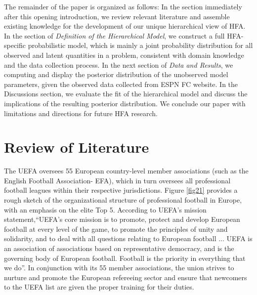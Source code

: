 \documentclass[USenglish]{article}
\begin{document}
The remainder of the paper is organized as follows: In the section immediately after this opening introduction, we review relevant literature and assemble existing knowledge for the development of our unique hierarchical view of HFA. 
In the section of \textit{Definition of the Hierarchical Model}, we construct a full HFA-specific probabilistic model, which is mainly a joint probability distribution for all observed and latent quantities in a problem, consistent with domain knowledge and the data collection process.
In the next section of \textit{Data and Results}, we computing and display the posterior distribution of the unobserved model parameters, given the observed data collected from ESPN FC website.
In the Discussions section, we evaluate the fit of the hierarchical model and discuss the implications of the resulting posterior distribution. We conclude our paper with limitations and directions for future HFA research.
 
\section{Review of Literature} 

The UEFA oversees 55 European country-level member associations (such as the English Football Association- EFA), which in turn oversees all professional football leagues within their respective jurisdictions. Figure \ref{fig21} provides a rough sketch of the organizational structure of professional football in Europe, with an emphasis on the elite Top 5. According to UEFA's mission statement,``UEFA's core mission is to promote, protect and develop European football at every level of the game, to promote the principles of unity and solidarity, and to deal with all questions relating to European football ... UEFA is an association of associations based on representative democracy, and is the governing body of European football. Football is the priority in everything that we do''.
In conjunction with its 55 member associations, the union strives to nurture and promote the European refereeing sector  and ensure that newcomers to the UEFA list are given the proper training for their duties.
\end{document}
